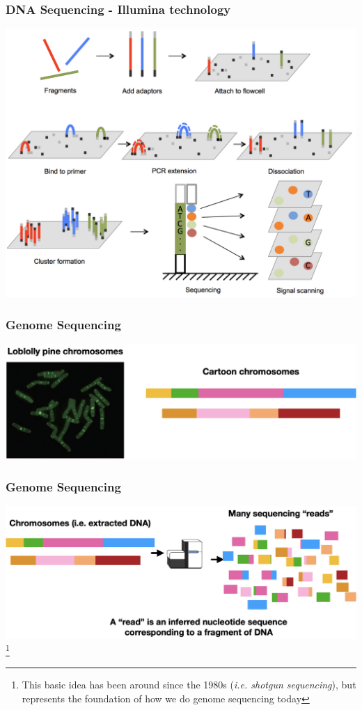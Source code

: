 \documentclass{beamer}
\newcommand\blfootnote[1]{%
	\begingroup
	\renewcommand\thefootnote{}\footnote{#1}%
	\addtocounter{footnote}{-1}%
	\endgroup
}
\begin{document}
\begin{frame}
	\frametitle{DNA Sequencing - Illumina technology}
			\includegraphics[width=\textwidth]{img/illumina}
\end{frame}

\begin{frame}
	\frametitle{Genome Sequencing}
		\includegraphics[width=\textwidth]{img/loblolly2cartoon}
\end{frame}


\begin{frame}
		\frametitle{Genome Sequencing}
		\includegraphics[width=\textwidth]{img/chroms2reads}
		\blfootnote{This basic idea has been around since the 1980s (\textit{i.e. shotgun sequencing}), but represents the foundation of how we do genome sequencing today}
\end{frame}
\end{document}
